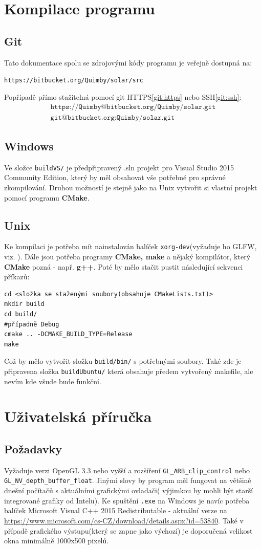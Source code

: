 \chapter{Kompilace programu}
\label{chap:kompilace}
\section{Git}
Tato dokumentace spolu se zdrojovými kódy programu je veřejně dostupná na:
\begin{center}
	\texttt{https://bitbucket.org/Quimby/solar/src}
\end{center}
Popřípadě přímo stažitelná pomocí git HTTPS\eqref{git:https} nebo SSH\eqref{git:ssh}:
\begin{align}
\label{git:https}
\texttt{https://Quimby@bitbucket.org/Quimby/solar.git}\\
\label{git:ssh}
\texttt{git@bitbucket.org:Quimby/solar.git}
\end{align}
\section{Windows}
Ve složce \texttt{buildVS/} je předpřipravený .sln projekt pro Visual Studio 2015 Community Edition, který by měl obsahovat vše potřebné pro správné zkompilování. Druhou možností je stejně jako na Unix vytvořit si vlastní projekt pomocí programu \textbf{CMake}.
\section{Unix}
Ke kompilaci je potřeba mít nainstalován balíček \texttt{xorg-dev}(vyžaduje ho GLFW, viz. \cite{GLFW}). Dále jsou potřeba programy \textbf{CMake, make} a nějaký kompilátor, který \textbf{CMake} pozná - např. \textbf{g++}. Poté by mělo stačit pustit následující sekvenci příkazů:
\begin{lstlisting}
cd <složka se staženými soubory(obsahuje CMakeLists.txt)>
mkdir build
cd build/
#případně Debug
cmake .. -DCMAKE_BUILD_TYPE=Release 
make
\end{lstlisting}
Což by mělo vytvořit složku \lstinline|build/bin/| s potřebnými soubory. Také zde je připravena složka \texttt{buildUbuntu/} která obsahuje předem vytvořený makefile, ale nevím kde všude bude funkční.
\chapter{Uživatelská příručka}
\label{chap:userGuide}
\section{Požadavky}
Vyžaduje verzi OpenGL 3.3 nebo vyšší a rozšíření  \texttt{GL\_ARB\_clip\_control} nebo \texttt{GL\_NV\_depth\_buffer\_float}. Jinými slovy by program měl fungovat na většině dnešní počítačů s aktuálními grafickými ovladači( výjimkou by mohli být starší integrované grafiky od Intelu). Ke spuštění \texttt{.exe} na Windows je navíc potřeba balíček Microsoft Visual C++ 2015 Redistributable - aktuální verze na \url{https://www.microsoft.com/cs-CZ/download/details.aspx?id=53840}.
Také v případě grafického výstupu(který se zapne jako výchozí) je doporučená velikost okna minimálně 1000x500 pixelů.
